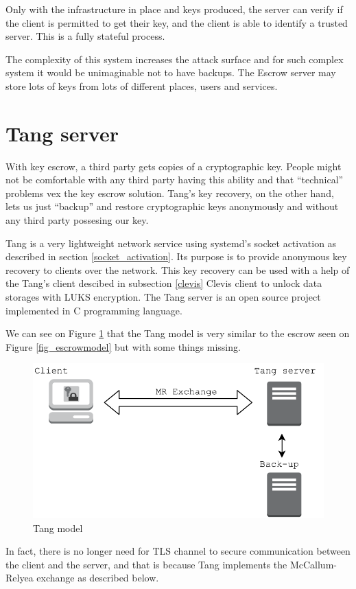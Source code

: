 Only with the infrastructure in place and keys produced, the server can verify if the client is permitted to get their key, and the client is able to identify a trusted server.
This is a fully stateful process.

The complexity of this system increases the attack surface and for such complex system it would be unimaginable not to have backups.
The Escrow server may store lots of keys from lots of different places, users and services.



\section{Tang server}\label{tang}

With key escrow, a third party gets copies of a cryptographic key.
People might not be comfortable with any third party having this ability and that “technical” problems vex the key escrow solution.
Tang's key recovery, on the other hand, lets us just “backup” and restore cryptographic keys anonymously and without any third party possesing our key.

Tang is a very lightweight network service using systemd's socket activation as described in section \ref{socket_activation}.
Its purpose is to provide anonymous key recovery to clients over the network.
This key recovery can be used with a help of the Tang's client descibed in subsection \ref{clevis} Clevis client to unlock data storages with LUKS encryption.
The Tang server is an open source project implemented in C programming language.

We can see on Figure \ref{fig_tangmodel} that the Tang model is very similar to the escrow seen on Figure \ref{fig_escrowmodel} but with some things missing.
\begin{figure}[h]
    \centering
    \includegraphics[scale=0.7]{figures/TangModel.pdf}
    \caption{Tang model}
    \label{fig_tangmodel}
\end{figure}
In fact, there is no longer need for TLS channel to secure communication between the client and the server,
 and that is because Tang implements the McCallum-Relyea exchange as described below.

